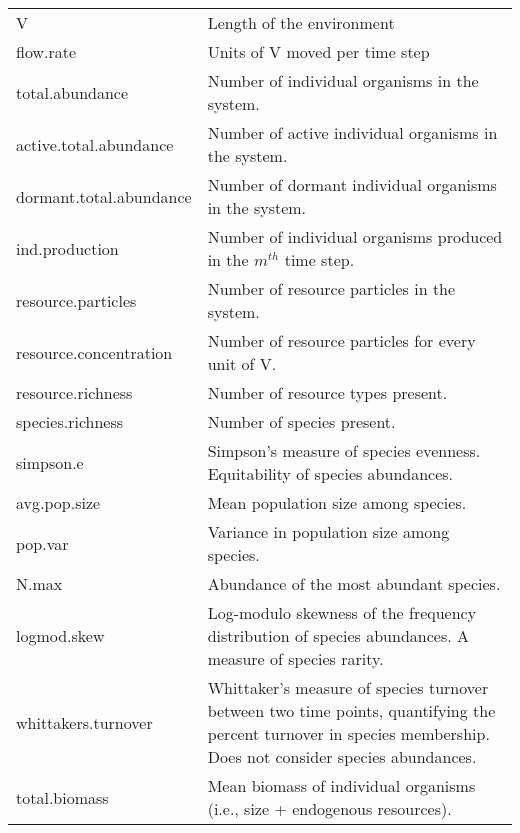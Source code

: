 \documentclass[12pt]{article}
\begin{document}
\begin{longtable}{| p{} | p{} |}
V & Length of the environment \\[6pt]

flow.rate & Units of V moved per time step \\[6pt]

total.abundance & Number of individual organisms in the system. \\[6pt]

active.total.abundance & Number of active individual organisms in the system. \\[6pt]

dormant.total.abundance & Number of dormant individual organisms in the system. \\[6pt]

ind.production & Number of individual organisms produced in the $m^{th}$ time step. \\[6pt]

resource.particles & Number of resource particles in the system. \\[6pt]

resource.concentration & Number of resource particles for every unit of V. \\[6pt]

resource.richness & Number of resource types present. \\[6pt]

species.richness & Number of species present. \\[6pt]

simpson.e & Simpson's measure of species evenness. Equitability of species abundances. \\[6pt]

avg.pop.size & Mean population size among species. \\[6pt]

pop.var & Variance in population size among species. \\[6pt]

N.max & Abundance of the most abundant species. \\[6pt]

logmod.skew & Log-modulo skewness of the frequency distribution of species abundances. A measure of species rarity. \\[6pt]

whittakers.turnover & Whittaker's measure of species turnover between two time points, quantifying the percent turnover in species membership. Does not consider species abundances. \\[6pt]

total.biomass & Mean biomass of individual organisms (i.e., size + endogenous resources). \\[6pt]


\end{longtable}
\end{document}
